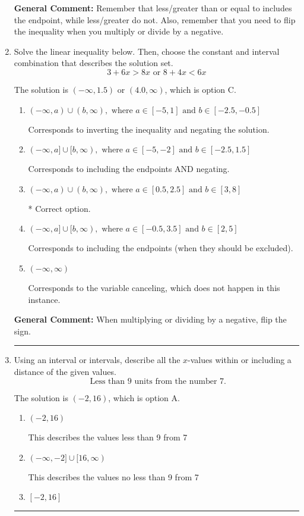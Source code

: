 \documentclass{extbook}[14pt]
\newcommand{\litem}[1]{\item #1

\rule{\textwidth}{0.4pt}}
\begin{document}
\begin{enumerate}
{\textbf{General Comment:} Remember that less/greater than or equal to includes the endpoint, while less/greater do not. Also, remember that you need to flip the inequality when you multiply or divide by a negative.
}
\litem{
Solve the linear inequality below. Then, choose the constant and interval combination that describes the solution set.
\[ 3 + 6 x > 8 x \text{ or } 8 + 4 x < 6 x \]

The solution is \( (-\infty, 1.5) \text{ or } (4.0, \infty) \), which is option C.\begin{enumerate}[label=\Alph*.]
\item \( (-\infty, a) \cup (b, \infty), \text{ where } a \in [-5, 1] \text{ and } b \in [-2.5, -0.5] \)

Corresponds to inverting the inequality and negating the solution.
\item \( (-\infty, a] \cup [b, \infty), \text{ where } a \in [-5, -2] \text{ and } b \in [-2.5, 1.5] \)

Corresponds to including the endpoints AND negating.
\item \( (-\infty, a) \cup (b, \infty), \text{ where } a \in [0.5, 2.5] \text{ and } b \in [3, 8] \)

 * Correct option.
\item \( (-\infty, a] \cup [b, \infty), \text{ where } a \in [-0.5, 3.5] \text{ and } b \in [2, 5] \)

Corresponds to including the endpoints (when they should be excluded).
\item \( (-\infty, \infty) \)

Corresponds to the variable canceling, which does not happen in this instance.
\end{enumerate}

\textbf{General Comment:} When multiplying or dividing by a negative, flip the sign.
}
\litem{
Using an interval or intervals, describe all the $x$-values within or including a distance of the given values.
\[ \text{ Less than } 9 \text{ units from the number } 7. \]

The solution is \( (-2, 16) \), which is option A.\begin{enumerate}[label=\Alph*.]
\item \( (-2, 16) \)

This describes the values less than 9 from 7
\item \( (-\infty, -2] \cup [16, \infty) \)

This describes the values no less than 9 from 7
\item \( [-2, 16] \)


\end{enumerate}}
\end{enumerate}
\end{document}
